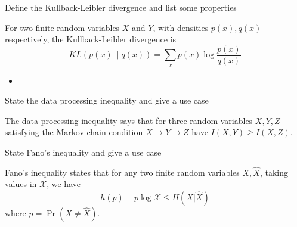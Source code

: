 \documentclass[avery5388,grid,frame]{flashcards}
\begin{document}
\begin{flashcard}
    {Define the Kullback-Leibler divergence and list some properties}
    \begin{definition}
        For two finite random variables $X$ and $Y$, with densities $p(x),q(x)$ respectively, the Kullback-Leibler divergence is
        $$KL(p(x) \| q(x)) = \sum_x p(x) \log \frac{p(x)}{q(x)}$$
    \end{definition}

    \begin{properties}
        \begin{itemize}
            \item
        \end{itemize}
    \end{properties}
\end{flashcard}


\begin{flashcard}
    {State the data processing inequality and give a use case}
    \begin{definition}
        The data processing inequality says that for three random variables $X,Y,Z$ satisfying the Markov chain condition $X \rightarrow Y \rightarrow Z$ have $I(X,Y) \geq I(X,Z)$.
    \end{definition}

    \begin{example}

    \end{example}
\end{flashcard}


\begin{flashcard}
    {State Fano's inequality and give a use case}
    \begin{definition}
        Fano's inequality states that for any two finite random variables $X,\hat X$, taking values in $\mathcal X$, we have
        $$h(p) + p \log \mathcal X \leq H(X | \hat X)$$
        where $p = \Pr(X \not = \hat X)$.
    \end{definition}

    \begin{example}

    \end{example}
\end{flashcard}


\begin{flashcard}
    {}
\end{flashcard}
\end{document}
